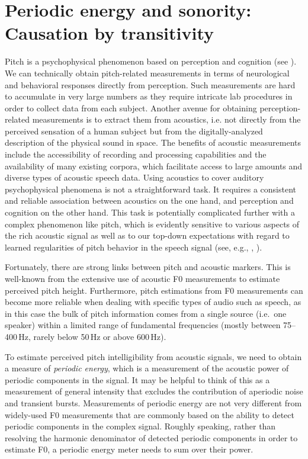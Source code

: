 \section{Periodic energy and sonority: Causation by transitivity}\label{sec:periodicenergy}

Pitch is a psychophysical phenomenon based on perception and cognition (see \citealt{plomp1976aspects, plack2005psychophysics}). We can technically obtain pitch-related measurements in terms of neurological and behavioral responses directly from perception. Such measurements are hard to accumulate in very large numbers as they require intricate lab procedures in order to collect data from each subject.
Another avenue for obtaining perception-related measurements is to extract them from acoustics, i.e. not directly from the perceived sensation of a human subject but from the digitally-analyzed description of the physical sound in space.
The benefits of acoustic measurements include the accessibility of recording and processing capabilities and the availability of many existing corpora, which facilitate access to large amounts and diverse types of acoustic speech data.
Using acoustics to cover auditory psychophysical phenomena is not a straightforward task. It requires a consistent and reliable association between acoustics on the one hand, and perception and cognition on the other hand.
This task is potentially complicated further with a complex phenomenon like pitch, which is evidently sensitive to various aspects of the rich acoustic signal as well as to our top-down expectations with regard to learned regularities of pitch behavior in the speech signal (see, e.g., \citealt{houtsma1995pitch, mcpherson2018diversity}, \cite[203]{moore2013anintro, shepard2001pitch}).

Fortunately, there are strong links between pitch and acoustic markers. This is well-known from the extensive use of acoustic F0 measurements to estimate perceived pitch height.
Furthermore, pitch estimations from F0 measurements can become more reliable when dealing with specific types of audio such as speech, as in this case the bulk of pitch information comes from a single source (i.e.~one speaker) within a limited range of fundamental frequencies (mostly between 75--400\,Hz, rarely below 50\,Hz or above 600\,Hz).

To estimate perceived pitch intelligibility from acoustic signals, we need to obtain a measure of \emph{periodic energy}, which is a measurement of the acoustic power of periodic components in the signal. It may be helpful to think of this as a measurement of general intensity that excludes the contribution of aperiodic noise and transient bursts.
Measurements of periodic energy are not very different from widely-used F0 measurements that are commonly based on the ability to detect periodic components in the complex signal. Roughly speaking, rather than resolving the harmonic denominator of detected periodic components in order to estimate F0, a periodic energy meter needs to sum over their power.

